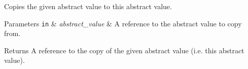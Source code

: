 Copies the given abstract value to this abstract value.


\begin{DoxyParams}[1]{Parameters}
\mbox{\tt in}  & {\em abstract\+\_\+value} & A reference to the abstract value to copy from. \\
\hline
\end{DoxyParams}
\begin{DoxyReturn}{Returns}
A reference to the copy of the given abstract value (i.\+e. this abstract value). 
\end{DoxyReturn}
